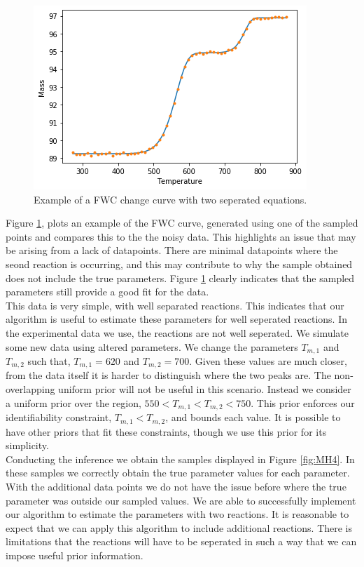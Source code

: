 \begin{figure}[h!]
\centering
\includegraphics[scale=0.7]{figures/bayesian/2_reactions/mass/Example_FWC.png}
\caption{Example of a FWC change curve with two seperated equations.}
\label{fig:FWC_EX2}
\end{figure}

Figure \ref{fig:FWC_EX2}, plots an example of the FWC curve, generated using one of the sampled points and compares this to the the noisy data. This highlights an issue that may be arising from a lack of datapoints. There are minimal datapoints where the seond reaction is occurring, and this may contribute to why the sample obtained does not include the true parameters. Figure \ref{fig:FWC_EX2} clearly indicates that the sampled parameters still provide a good fit for the data.\\

This data is very simple, with well separated reactions. This indicates that our algorithm is useful to estimate these parameters for well seperated reactions. In the experimental data we use, the reactions are not well seperated. We simulate some new data using altered parameters. We change the parameters $T_{m,1}$ and $T_{m,2}$ such that, $T_{m,1}=620$ and $T_{m,2}=700$. Given these values are much closer, from the data itself it is harder to distinguish where the two peaks are. The non-overlapping uniform prior will not be useful in this scenario. Instead we consider a uniform prior over the region, $550<T_{m,1}<T_{m,2}<750$. This prior enforces our identifiability constraint, $T_{m,1}<T_{m,2}$, and bounds each value. It is possible to have other priors that fit these constraints, though we use this prior for its simplicity.\\

Conducting the inference we obtain the samples displayed in Figure \ref{fig:MH4}. In these samples we correctly obtain the true parameter values for each parameter. With the additional data points we do not have the issue before where the true parameter was outside our sampled values. We are able to successfully implement our algorithm to estimate the parameters with two reactions. It is reasonable to expect that we can apply this algorithm to include additional reactions. There is limitations that the reactions will have to be seperated in such a way that we can impose useful prior information.

